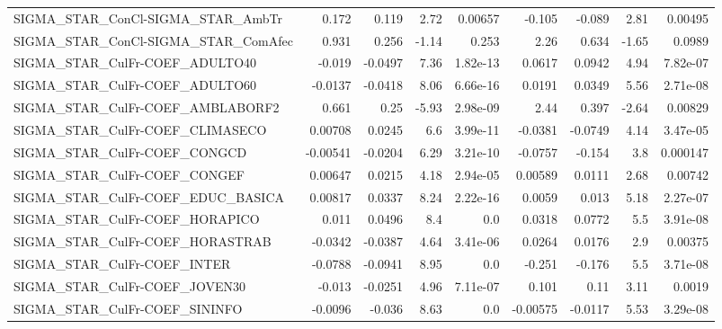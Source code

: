\begin{tabular}{lrrrrrrrr}
SIGMA\_STAR\_ConCl-SIGMA\_STAR\_AmbTr     &       0.172 &        0.119 &     2.72 &  0.00657 &     -0.105 &      -0.089 &         2.81 &       0.00495 \\
SIGMA\_STAR\_ConCl-SIGMA\_STAR\_ComAfec   &       0.931 &        0.256 &    -1.14 &    0.253 &       2.26 &       0.634 &        -1.65 &        0.0989 \\
SIGMA\_STAR\_CulFr-COEF\_ADULTO40        &      -0.019 &      -0.0497 &     7.36 & 1.82e-13 &     0.0617 &      0.0942 &         4.94 &      7.82e-07 \\
SIGMA\_STAR\_CulFr-COEF\_ADULTO60        &     -0.0137 &      -0.0418 &     8.06 & 6.66e-16 &     0.0191 &      0.0349 &         5.56 &      2.71e-08 \\
SIGMA\_STAR\_CulFr-COEF\_AMBLABORF2      &       0.661 &         0.25 &    -5.93 & 2.98e-09 &       2.44 &       0.397 &        -2.64 &       0.00829 \\
SIGMA\_STAR\_CulFr-COEF\_CLIMASECO       &     0.00708 &       0.0245 &      6.6 & 3.99e-11 &    -0.0381 &     -0.0749 &         4.14 &      3.47e-05 \\
SIGMA\_STAR\_CulFr-COEF\_CONGCD          &    -0.00541 &      -0.0204 &     6.29 & 3.21e-10 &    -0.0757 &      -0.154 &          3.8 &      0.000147 \\
SIGMA\_STAR\_CulFr-COEF\_CONGEF          &     0.00647 &       0.0215 &     4.18 & 2.94e-05 &    0.00589 &      0.0111 &         2.68 &       0.00742 \\
SIGMA\_STAR\_CulFr-COEF\_EDUC\_BASICA     &     0.00817 &       0.0337 &     8.24 & 2.22e-16 &     0.0059 &       0.013 &         5.18 &      2.27e-07 \\
SIGMA\_STAR\_CulFr-COEF\_HORAPICO        &       0.011 &       0.0496 &      8.4 &      0.0 &     0.0318 &      0.0772 &          5.5 &      3.91e-08 \\
SIGMA\_STAR\_CulFr-COEF\_HORASTRAB       &     -0.0342 &      -0.0387 &     4.64 & 3.41e-06 &     0.0264 &      0.0176 &          2.9 &       0.00375 \\
SIGMA\_STAR\_CulFr-COEF\_INTER           &     -0.0788 &      -0.0941 &     8.95 &      0.0 &     -0.251 &      -0.176 &          5.5 &      3.71e-08 \\
SIGMA\_STAR\_CulFr-COEF\_JOVEN30         &      -0.013 &      -0.0251 &     4.96 & 7.11e-07 &      0.101 &        0.11 &         3.11 &        0.0019 \\
SIGMA\_STAR\_CulFr-COEF\_SININFO         &     -0.0096 &       -0.036 &     8.63 &      0.0 &   -0.00575 &     -0.0117 &         5.53 &      3.29e-08 \\

\end{tabular}
